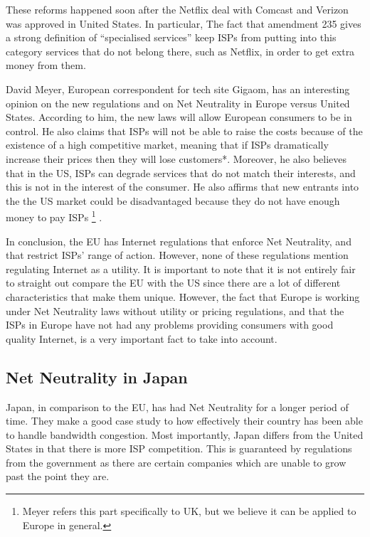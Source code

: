 \documentclass{sigcomm-alternate}
\begin{document}
These reforms happened soon after the Netflix deal with Comcast and Verizon was approved in United States. In particular, The fact that amendment 235 gives a strong definition of “specialised services”  keep ISPs from putting into this category services that do not belong there, such as Netflix, in order to get extra money from them\cite{gigaom}.

David Meyer, European correspondent for tech site Gigaom, has an interesting opinion on the new regulations and on Net Neutrality in Europe versus United States. According to him, the new laws will allow European consumers to be in control. He also claims that ISPs will not be able to raise the costs because of the existence of a high competitive market, meaning that if ISPs dramatically increase their prices then they will lose customers*. Moreover, he also believes that in the US, ISPs can degrade services that do not match their interests, and this is not in the interest of the consumer. He also affirms that new entrants into the the US market could be disadvantaged because they do not have enough money to pay ISPs \cite{inthenews} \footnote{Meyer refers this part specifically to UK, but we believe it can be applied to Europe in general.} .

In conclusion, the EU has Internet regulations that enforce Net Neutrality, and that restrict ISPs’ range of action. However, none of these regulations mention regulating Internet as a utility. It is important to note that it is not entirely fair to straight out compare the EU with the US since there are a lot of different characteristics that make them unique. However, the fact that Europe is working under Net Neutrality laws without utility or pricing regulations, and that the ISPs in Europe have not had any problems providing consumers with good quality Internet, is a very important fact to take into account.



\subsection{Net Neutrality in Japan}

Japan, in comparison to the EU, has had Net Neutrality for a longer period of time.  They make a good case study to how effectively their country has been able to handle bandwidth congestion.  Most importantly, Japan differs from the United States in that there is more ISP competition\cite{jitsuzumi2011japan}.  This is guaranteed by regulations from the government as there are certain companies which are unable to grow past the point they are.
\end{document}
